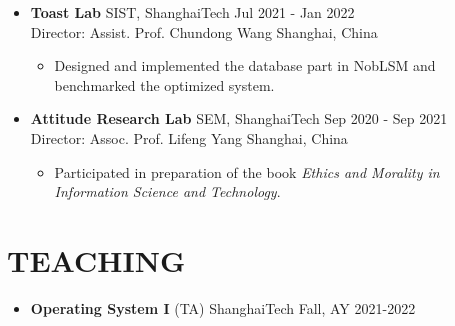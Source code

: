 \documentclass[a4paper,10pt]{ctexart} %
\begin{document}
    \begin{itemize}
        \item \textbf{Toast Lab} \quad SIST, ShanghaiTech \hfill Jul 2021 - Jan 2022 \\
        {\small Director: Assist. Prof. Chundong Wang} \hfill Shanghai, China
        \begin{small}
            \begin{itemize}
                \item Designed and implemented the database part in NobLSM and benchmarked the optimized system.
            \end{itemize}
        \end{small}
    \end{itemize}

    \begin{itemize}
        \item \textbf{Attitude Research Lab} \quad SEM, ShanghaiTech \hfill Sep 2020 - Sep 2021 \\
        {\small Director: Assoc. Prof. Lifeng Yang} \hfill Shanghai, China
        \begin{small}
            \begin{itemize}
                \item Participated in preparation of the book \textit{Ethics and Morality in Information Science and Technology}.
            \end{itemize}
        \end{small}
    \end{itemize}



\section{TEACHING}

    \begin{itemize}
        \item \textbf{Operating System I} (TA) \hfill ShanghaiTech \quad Fall, AY 2021-2022
    \end{itemize}


\end{document}
